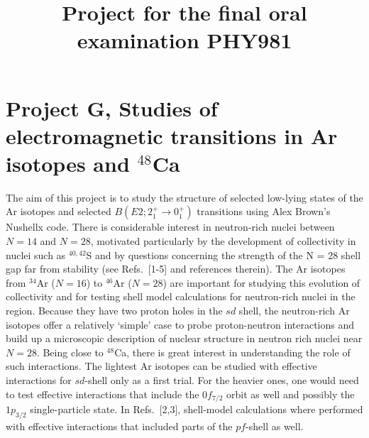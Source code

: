 \documentclass[prc]{revtex4}
\begin{document}
\title{Project for the final oral examination PHY981}
\maketitle
\section*{Project G, Studies of electromagnetic transitions in Ar isotopes and $^{48}$Ca}

The aim of this project is to study the structure of selected low-lying states of the Ar isotopes and selected 
$B(E2; 2^+_1\rightarrow 0^+_1)$  transitions using Alex Brown's Nushellx code. 
There is considerable interest in neutron-rich nuclei between $N = 14$ and $N = 28$,
motivated particularly by the development of collectivity in nuclei such as
$^{40,42}$S and by questions
concerning the strength of the N = 28 shell gap far from stability (see Refs.~[1-5] and references
therein). The Ar isotopes from $^{34}$Ar ($N = 16$) to $^{46}$Ar ($N = 28$) are important for studying this
evolution of collectivity and for testing shell model calculations for neutron-rich nuclei in the
region. Because they have two proton holes in the $sd$ shell, the neutron-rich Ar isotopes offer a
relatively ‘simple’ case to probe proton-neutron interactions and build up a
microscopic description of nuclear structure in neutron rich nuclei near $N = 28$. Being close to $^{48}$Ca, there 
is great interest in understanding the role of such interactions.   
The lightest Ar isotopes can be studied with effective interactions for $sd$-shell only as a first trial. 
For the heavier ones, one would need to test 
effective interactions that include the $0f_{7/2}$ orbit as well and possibly the $1p_{3/2}$ single-particle state. 
In Refs.~[2,3], shell-model calculations where performed
with effective interactions that included parts of the $pf$-shell as well. 
\end{document}
